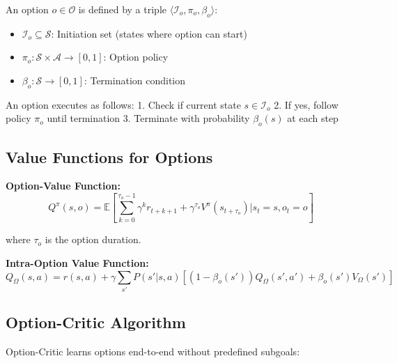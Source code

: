 \begin{definition}[Option]
An option $o \in \mathcal{O}$ is defined by a triple $\langle \mathcal{I}_o, \pi_o, \beta_o \rangle$:
\begin{itemize}
    \item $\mathcal{I}_o \subseteq \mathcal{S}$: Initiation set (states where option can start)
    \item $\pi_o: \mathcal{S} \times \mathcal{A} \to [0,1]$: Option policy
    \item $\beta_o: \mathcal{S} \to [0,1]$: Termination condition
\end{itemize}
\end{definition}

An option executes as follows:
1. Check if current state $s \in \mathcal{I}_o$
2. If yes, follow policy $\pi_o$ until termination
3. Terminate with probability $\beta_o(s)$ at each step

\subsection{Value Functions for Options}

\textbf{Option-Value Function:}
\begin{equation}
Q^\pi(s, o) = \mathbb{E} \left[ \sum_{k=0}^{\tau_o-1} \gamma^k r_{t+k+1} + \gamma^{\tau_o} V^\pi(s_{t+\tau_o}) \bigg| s_t = s, o_t = o \right]
\end{equation}

where $\tau_o$ is the option duration.

\textbf{Intra-Option Value Function:}
\begin{equation}
Q_\Omega(s, a) = r(s, a) + \gamma \sum_{s'} P(s'|s, a) \left[ (1 - \beta_o(s')) Q_\Omega(s', a') + \beta_o(s') V_\Omega(s') \right]
\end{equation}

\subsection{Option-Critic Algorithm}

Option-Critic learns options end-to-end without predefined subgoals:

